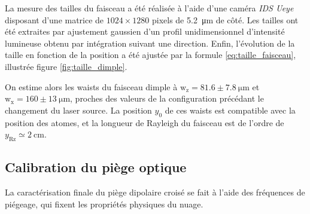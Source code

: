 La mesure des tailles du faisceau a été réalisée à l'aide d'une caméra \emph{IDS Ueye} disposant d'une matrice de $1024 \times 1280$ pixels de \SI{5.2}{\micro\metre} de côté. Les tailles ont été extraites par ajustement gaussien d'un profil unidimensionnel d'intensité lumineuse obtenu par intégration suivant une direction. Enfin, l'évolution de la taille en fonction de la position a été ajustée par la formule \ref{eq:taille_faisceau}, illustrée figure \ref{fig:taille_dimple}.



On estime alors les waists du faisceau dimple à $\mathrm{w_z}=81.6\pm\SI{7.8}{\micro\metre}$ et $\mathrm{w_x}=160\pm \SI{13}{\micro\metre}$, proches des valeurs de la configuration précédant le changement du laser source. La position $y_0$ de ces waists est compatible avec la position des atomes, et la longueur de Rayleigh du faisceau est de l'ordre de $y_{\mathrm{Rz}}\simeq \SI{2}{\centi\metre}$.



\subsection{Calibration du piège optique}
\label{sc:calibration_piege_optique}

La caractérisation finale du piège dipolaire croisé se fait à l'aide des fréquences de piégeage, qui fixent les propriétés physiques du nuage. %


